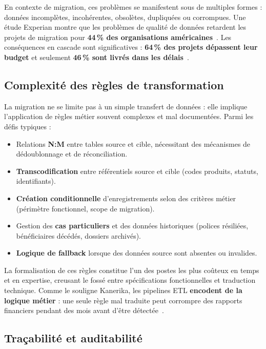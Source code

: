 En contexte de migration, ces problèmes se manifestent sous de multiples
formes : données incomplètes, incohérentes, obsolètes, dupliquées ou
corrompues. Une étude Experian montre que les problèmes de qualité de
données retardent les projets de migration pour \textbf{44\,\% des
organisations américaines}~\cite{alation_migration}. Les conséquences en
cascade sont significatives : \textbf{64\,\% des projets dépassent leur
budget} et seulement \textbf{46\,\% sont livrés dans les
délais}~\cite{montecarlo2025}.

\subsection{Complexité des règles de transformation}

La migration ne se limite pas à un simple transfert de données : elle
implique l'application de règles métier souvent complexes et mal
documentées. Parmi les défis typiques :

\begin{itemize}
    \item Relations \textbf{N:M} entre tables source et cible, nécessitant
    des mécanismes de dédoublonnage et de réconciliation.
    \item \textbf{Transcodification} entre référentiels source et cible
    (codes produits, statuts, identifiants).
    \item \textbf{Création conditionnelle} d'enregistrements selon des
    critères métier (périmètre fonctionnel, scope de migration).
    \item Gestion des \textbf{cas particuliers} et des données historiques
    (polices résiliées, bénéficiaires décédés, dossiers archivés).
    \item \textbf{Logique de fallback} lorsque des données source sont
    absentes ou invalides.
\end{itemize}

La formalisation de ces règles constitue l'un des postes les plus coûteux en
temps et en expertise, creusant le fossé entre spécifications fonctionnelles
et traduction technique. Comme le souligne Kanerika, les pipelines ETL
\textbf{encodent de la logique métier} : une seule règle mal traduite peut
corrompre des rapports financiers pendant des mois avant d'être
détectée~\cite{kanerika_etl}.

\subsection{Traçabilité et auditabilité}

